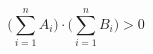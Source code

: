 \documentclass[nofonts]{ctexart}
\begin{document}
\[
	\biggl( \sum_{i=1}^n A_i \biggr) \cdot
	\biggl( \sum_{i=1}^n B_i \biggr) >0
\]
\end{document}
